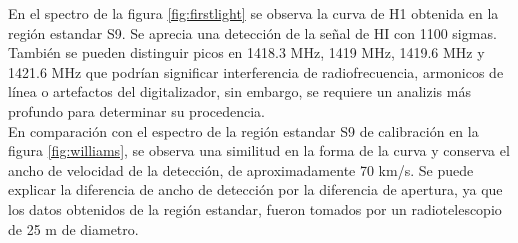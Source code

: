 En el spectro de la figura \ref{fig:firstlight} se observa la curva de H1 obtenida en la región estandar S9. Se aprecia una detección de la señal de HI con 1100 sigmas. También se pueden distinguir picos en 1418.3 MHz, 1419 MHz, 1419.6 MHz y 1421.6 MHz que podrían significar interferencia de radiofrecuencia, armonicos de línea o artefactos del digitalizador, sin embargo, se requiere un analizis más profundo para determinar su procedencia.\\

En comparación con el espectro de la región estandar S9 de calibración en la figura \ref{fig:williams}, se observa una similitud en la forma de la curva y conserva el ancho de velocidad de la detección, de aproximadamente 70 km/s. Se puede explicar la diferencia de ancho de detección por la diferencia de apertura, ya que los datos obtenidos de la región estandar, fueron tomados por un radiotelescopio de 25 m de diametro.\\
